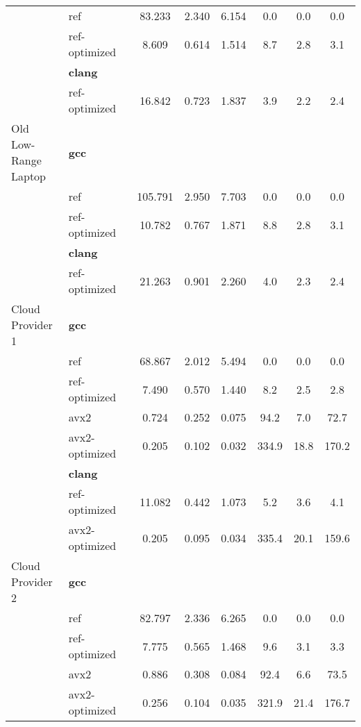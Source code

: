 \begin{table}
\begin{tabularx}{\linewidth}{l l c c c c c c}
          & ref & 83.233 & 2.340 & 6.154 & 0.0 & 0.0 & 0.0\\
          & ref-optimized & 8.609 & 0.614 & 1.514 & 8.7 & 2.8 & 3.1\\
          & \textbf{clang} & & & & & \\
          & ref-optimized & 16.842 & 0.723 & 1.837 & 3.9 & 2.2 & 2.4\\
          \midrule
          \multirowcell{5}{Old\\ Low-Range\\ Laptop}
          & \textbf{gcc} & & & & & \\
          & ref & 105.791 & 2.950 & 7.703 & 0.0 & 0.0 & 0.0\\
          & ref-optimized & 10.782 & 0.767 & 1.871 & 8.8 & 2.8 & 3.1\\
          & \textbf{clang} & & & & & \\
          & ref-optimized & 21.263 & 0.901 & 2.260 & 4.0 & 2.3 & 2.4\\
          \midrule
          \multirowcell{8}{Cloud\\ Provider\\ 1}
          & \textbf{gcc} & & & & & \\
          & ref & 68.867 & 2.012 & 5.494 & 0.0 & 0.0 & 0.0\\
          & ref-optimized & 7.490 & 0.570 & 1.440 & 8.2 & 2.5 & 2.8\\
          & avx2 & 0.724 & 0.252 & 0.075 & 94.2 & 7.0 & 72.7\\
          & avx2-optimized & 0.205 & 0.102 & 0.032 & 334.9 & 18.8 & 170.2\\
          & \textbf{clang} & & & & & \\
          & ref-optimized & 11.082 & 0.442 & 1.073 & 5.2 & 3.6 & 4.1\\
          & avx2-optimized & 0.205 & 0.095 & 0.034 & 335.4 & 20.1 & 159.6\\
          \midrule
          \multirowcell{8}{Cloud\\ Provider\\ 2}
          & \textbf{gcc} & & & & & \\
          & ref & 82.797 & 2.336 & 6.265 & 0.0 & 0.0 & 0.0\\
          & ref-optimized & 7.775 & 0.565 & 1.468 & 9.6 & 3.1 & 3.3\\
          & avx2 & 0.886 & 0.308 & 0.084 & 92.4 & 6.6 & 73.5\\
          & avx2-optimized & 0.256 & 0.104 & 0.035 & 321.9 & 21.4 & 176.7\\

\end{tabularx}
\end{table}
